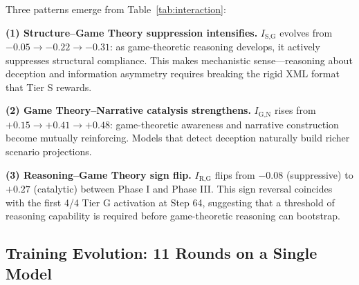 \documentclass[sigconf]{acmart}
\begin{document}
Three patterns emerge from Table~\ref{tab:interaction}:

\textbf{(1) Structure--Game Theory suppression intensifies.} $I_{\text{S,G}}$ evolves from $-0.05 \to -0.22 \to -0.31$: as game-theoretic reasoning develops, it actively suppresses structural compliance. This makes mechanistic sense---reasoning about deception and information asymmetry requires breaking the rigid XML format that Tier S rewards.

\textbf{(2) Game Theory--Narrative catalysis strengthens.} $I_{\text{G,N}}$ rises from $+0.15 \to +0.41 \to +0.48$: game-theoretic awareness and narrative construction become mutually reinforcing. Models that detect deception naturally build richer scenario projections.

\textbf{(3) Reasoning--Game Theory sign flip.} $I_{\text{R,G}}$ flips from $-0.08$ (suppressive) to $+0.27$ (catalytic) between Phase I and Phase III. This sign reversal coincides with the first 4/4 Tier G activation at Step 64, suggesting that a threshold of reasoning capability is required before game-theoretic reasoning can bootstrap.

\subsection{Training Evolution: 11 Rounds on a Single Model}
\end{document}
